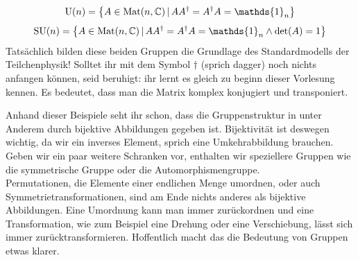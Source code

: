 \begin{Beispiel}
\begin{enumerate}
\begin{equation*}
        \text{U}(n)=\Menge{A\in\Met (n,\mathbb{C})}{AA^{\dagger}=A^{\dagger}A=\mathds{1}_{n}} 
    \end{equation*}
    \begin{equation*}
        \text{SU}(n)=\Menge{A\in \Met (n,\mathbb{C})}{AA^{\dagger}=A^{\dagger}A=\mathds{1}_{n} \land \det (A) = 1}
    \end{equation*}
    Tatsächlich bilden diese beiden Gruppen die Grundlage des Standardmodells der Teilchenphysik! Solltet ihr mit dem Symbol $\dagger$ (sprich \glqq{}dagger\grqq{}) noch nichts anfangen können, seid beruhigt: ihr lernt es gleich zu beginn dieser Vorlesung kennen. Es bedeutet, dass man die Matrix komplex konjugiert und transponiert.
\end{enumerate} 
\end{Beispiel}
Anhand dieser Beispiele seht ihr schon, dass die Gruppenstruktur in unter Anderem durch bijektive Abbildungen gegeben ist. Bijektivität ist deswegen wichtig, da wir ein inverses Element, sprich eine Umkehrabbildung brauchen. Geben wir ein paar weitere Schranken vor, enthalten wir speziellere Gruppen wie die symmetrische Gruppe oder die Automorphismengruppe. \\
Permutationen, die Elemente einer endlichen Menge umordnen, oder auch Symmetrietransformationen, sind am Ende nichts anderes als bijektive Abbildungen. Eine Umordnung kann man immer zurückordnen und eine Transformation, wie zum Beispiel eine Drehung oder eine Verschiebung, lässt sich immer zurücktransformieren. Hoffentlich macht das die Bedeutung von Gruppen etwas klarer. \\

